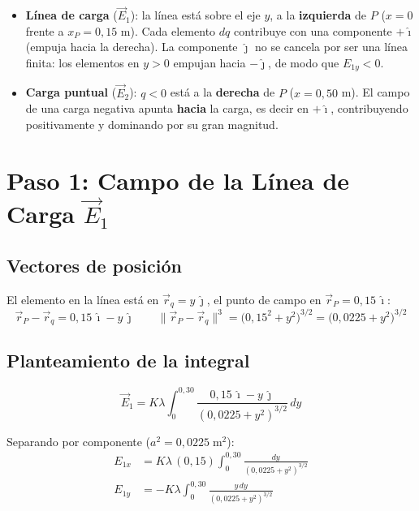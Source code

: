 \documentclass[12pt,letterpaper]{article}
\begin{document}
\begin{itemize}
    \item \textbf{L\'inea de carga} ($\vec{E}_1$): la l\'inea est\'a sobre el eje $y$, a la \textbf{izquierda} de $P$ ($x=0$ frente a $x_P = 0{,}15$ m). Cada elemento $dq$ contribuye con una componente $+\hat{\imath}$ (empuja hacia la derecha). La componente $\hat{\jmath}$ no se cancela por ser una l\'inea finita: los elementos en $y > 0$ empujan hacia $-\hat{\jmath}$, de modo que $E_{1y} < 0$.

    \item \textbf{Carga puntual} ($\vec{E}_2$): $q < 0$ est\'a a la \textbf{derecha} de $P$ ($x=0{,}50$ m). El campo de una carga negativa apunta \textbf{hacia} la carga, es decir en $+\hat{\imath}$, contribuyendo positivamente y dominando por su gran magnitud.
\end{itemize}

\section*{Paso 1: Campo de la L\'inea de Carga $\vec{E}_1$}

\subsection*{Vectores de posici\'on}

El elemento en la l\'inea est\'a en $\vec{r}_{q} = y\,\hat{\jmath}$, el punto de campo en $\vec{r}_{P} = 0{,}15\,\hat{\imath}$:
\begin{equation*}
    \vec{r}_{P} - \vec{r}_{q} = 0{,}15\,\hat{\imath} - y\,\hat{\jmath}
    \qquad
    \|\vec{r}_{P}-\vec{r}_{q}\|^3 = \bigl(0{,}15^2 + y^2\bigr)^{3/2}
    = \bigl(0{,}0225 + y^2\bigr)^{3/2}
\end{equation*}

\subsection*{Planteamiento de la integral}

\begin{equation*}
    \vec{E}_1
    = K\lambda\int_0^{0{,}30}
    \frac{0{,}15\,\hat{\imath} - y\,\hat{\jmath}}
         {(0{,}0225 + y^2)^{3/2}}\,dy
\end{equation*}

Separando por componente ($a^2 = 0{,}0225\;\text{m}^2$):
\begin{align*}
    E_{1x} &= K\lambda\,(0{,}15)
    \int_0^{0{,}30}\frac{dy}{(0{,}0225+y^2)^{3/2}}
    \\[6pt]
    E_{1y} &= -K\lambda
    \int_0^{0{,}30}\frac{y\,dy}{(0{,}0225+y^2)^{3/2}}
\end{align*}
\end{document}
